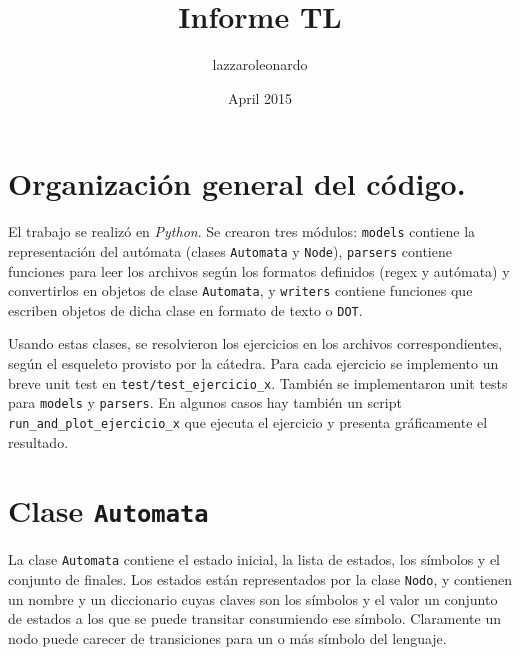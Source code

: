 \documentclass{article}
\title{Informe TL}
\author{lazzaroleonardo}
\date{April 2015}
\begin{document}

%



\begin{titlepage}
\maketitle
\thispagestyle{empty}
\end{titlepage} 

\newcommand{\Hopcroft}{\emph{Introduction to Automata Theory...} \citep{hopcroft}}




\section*{Organización general del código.}
El trabajo se realizó en \emph{Python}.  Se crearon tres módulos: \texttt{models} contiene la representación del autómata (clases \texttt{Automata} y \texttt{Node}), \texttt{parsers}  contiene funciones para leer los archivos según los formatos definidos (regex y autómata) y convertirlos en objetos de clase \texttt{Automata}, y \texttt{writers} contiene funciones que escriben objetos de dicha clase en formato de texto o \texttt{DOT}.  

Usando estas clases, se resolvieron los ejercicios en los archivos correspondientes, según el esqueleto provisto por la cátedra.  Para cada ejercicio se implemento un breve unit test en \texttt{test/test\_ejercicio\_x}.  También se implementaron unit tests para \texttt{models} y \texttt{parsers}.  En algunos casos hay también un script \texttt{run\_and\_plot\_ejercicio\_x} que ejecuta el ejercicio y presenta gráficamente el resultado.

\section*{Clase \texttt{Automata}}
La clase \texttt{Automata} contiene el estado inicial, la lista de estados, los símbolos y el conjunto de finales.  Los estados están representados por la clase \texttt{Nodo}, y contienen un nombre y un diccionario cuyas claves son los símbolos y el valor un conjunto de estados a los que se puede transitar consumiendo ese símbolo.  Claramente un nodo puede carecer de transiciones para un o más símbolo del lenguaje.
\end{document}
